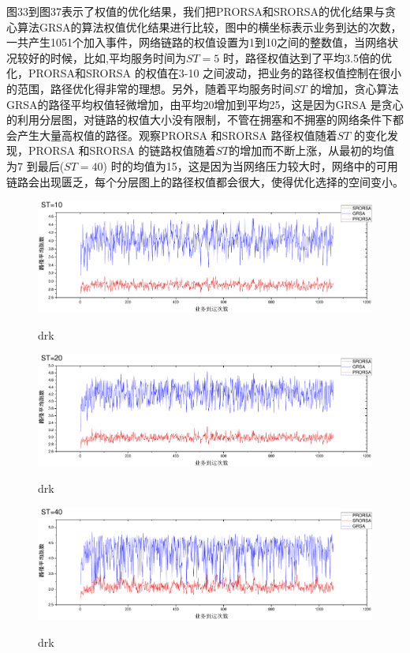 图33到图37表示了权值的优化结果，我们把PRORSA和SRORSA的优化结果与贪心算法GRSA的算法权值优化结果进行比较，图中的横坐标表示业务到达的次数，一共产生1051个加入事件，网络链路的权值设置为1到10之间的整数值，当网络状况较好的时候，比如,平均服务时间为$ST=5$ 时，路径权值达到了平均3.5倍的优化，PRORSA和SRORSA 的权值在3-10 之间波动，把业务的路径权值控制在很小的范围，路径优化得非常的理想。另外，随着平均服务时间$ST$ 的增加，贪心算法GRSA的路径平均权值轻微增加，由平均20增加到平均25，这是因为GRSA 是贪心的利用分层图，对链路的权值大小没有限制，不管在拥塞和不拥塞的网络条件下都会产生大量高权值的路径。观察PRORSA 和SRORSA 路径权值随着$ST$ 的变化发现，PRORSA 和SRORSA 的链路权值随着$ST$的增加而不断上涨，从最初的均值为7 到最后($ST=40$) 时的均值为15，这是因为当网络压力较大时，网络中的可用链路会出现匮乏，每个分层图上的路径权值都会很大，使得优化选择的空间变小。
\begin{figure}
\setlength{\belowcaptionskip}{-0.5cm}
  \begin{center}
    {\includegraphics[width=1 \textwidth]{figures/H10H.pdf}}
    \end{center}
  \caption{{\footnotesize{drk}}}
  \label{drk}
\end{figure}
\begin{figure}
\setlength{\belowcaptionskip}{-0.5cm}
  \begin{center}
    {\includegraphics[width=1 \textwidth]{figures/H20H.pdf}}
    \end{center}
  \caption{{\footnotesize{drk}}}
  \label{drk}
\end{figure}
\begin{figure}
\setlength{\belowcaptionskip}{-0.5cm}
  \begin{center}
    {\includegraphics[width=1 \textwidth]{figures/H40H.pdf}}
    \end{center}
  \caption{{\footnotesize{drk}}}
  \label{drk}
\end{figure}

